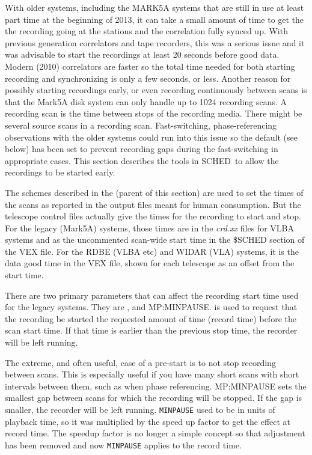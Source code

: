 \documentclass{report}
\newcommand{\schedb}{{\sc SCHED~}}
\begin{document}
With older systems, including the MARK5A systems that are still in use
at least part time at the beginning of 2013, it can take a small
amount of time to get the the recording going at the stations and the
correlation fully synced up.  With previous generation correlators and
tape recorders, this was a serious issue and it was advisable to start
the recordings at least 20 seconds before good data.  Modern (2010)
correlators are faster so the total time needed for both starting
recording and synchronizing is only a few seconds, or less.  Another
reason for possibly starting recordings early, or even recording
continuously between scans is that the Mark5A disk system can only
handle up to 1024 recording scans.  A recording scan is the time
between stops of the recording media.  There might be several source
scans in a recording scan.  Fast-switching, phase-referencing
observations with the older systems could run into this issue so the
default  (see below) has been set
to prevent recording gaps during the fast-switching in appropriate cases.
This section describes the tools in \schedb to allow the recordings to
be started early.

The schemes described in the  (parent of this section) are used to set the
times of the scans as reported in the output files meant for human
consumption.  But the telescope control files actually give the times
for the recording to start and stop.  For the legacy (Mark5A) systems,
those times are in the {\sl crd.xx} files for VLBA systems and as the
uncommented scan-wide start time in the \$SCHED section of the VEX
file.  For the RDBE (VLBA etc) and WIDAR (VLA) systems, it is the data
good time in the VEX file, shown for each telescope as an offset from
the start time.

There are two primary parameters that can affect the
recording start time used for the legacy systems.  They are
, and 
{MP:MINPAUSE}.  
is used to request that the recording be started the requested
amount of time (record time) before the scan start time.  If that time
is earlier than the previous stop time, the recorder will be left
running.  

The extreme, and often useful, case of a pre-start is to not stop
recording between scans.  This is especially useful if you have many
short scans with short intervals between them, such as when phase
referencing.   {MP:MINPAUSE} sets the smallest
gap between scans for which the recording will be stopped.  If the gap
is smaller, the recorder will be left running.  {\tt MINPAUSE} used to
be in units of playback time, so it was multiplied by the speed up
factor to get the effect at record time.  The speedup factor is no
longer a simple concept so that adjustment has been removed and now
{\tt MINPAUSE} applies to the record time.
\end{document}
